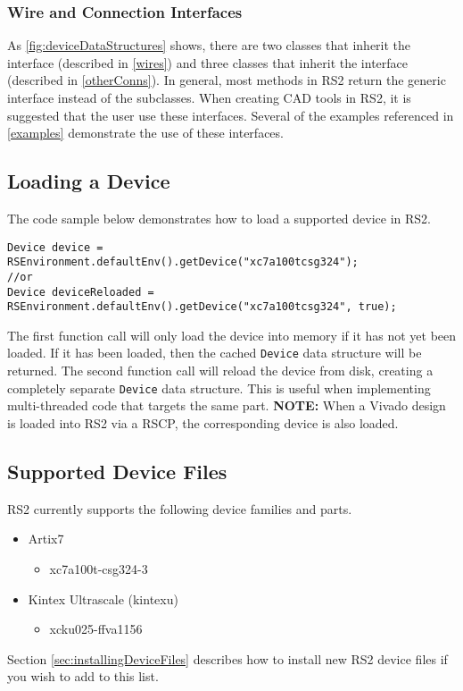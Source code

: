 \subsubsection{Wire and Connection Interfaces}
As \autoref{fig:deviceDataStructures} shows, there are two classes that
inherit the  interface (described in \autoref{wires}) and
three classes that inherit the  interface (described in 
\autoref{otherConns}). In general, most methods in RS2 return the
generic interface instead of the subclasses. When creating CAD tools in
RS2, it is suggested that the user use these interfaces. Several of the
examples referenced in \autoref{examples} demonstrate the use of these
interfaces.

\subsection{Loading a Device} \label{sec:loadingDevice}

The code sample below demonstrates how to load a supported device in
RS2.

\begin{lstlisting}[caption=Loading a Device, label=code:loadDevice]
Device device = RSEnvironment.defaultEnv().getDevice("xc7a100tcsg324");
//or
Device deviceReloaded = RSEnvironment.defaultEnv().getDevice("xc7a100tcsg324", true);
\end{lstlisting}

\noindent The first function call will only load the device into memory if it
has not yet been loaded. If it has been loaded, then the cached \texttt{Device}
data structure will be returned. The second function call will reload the device from
disk, creating a completely separate \texttt{Device} data structure. This is
useful when implementing multi-threaded code that targets the same part.
\textbf{NOTE:} When a Vivado design is loaded into RS2 via a RSCP, the
corresponding device is also loaded.

\subsection{Supported Device Files} \label{sec:supportedDevices}
RS2 currently supports the following device families and parts.

\begin {itemize}
  \item Artix7 
  	\begin{itemize}
  	  \item xc7a100t-csg324-3
  	\end{itemize}
  \item Kintex Ultrascale (kintexu)
    \begin{itemize}
  	  \item xcku025-ffva1156 
  	\end{itemize}
\end{itemize}

\noindent Section \ref{sec:installingDeviceFiles} describes how to install new
RS2 device files if you wish to add to this list. 
